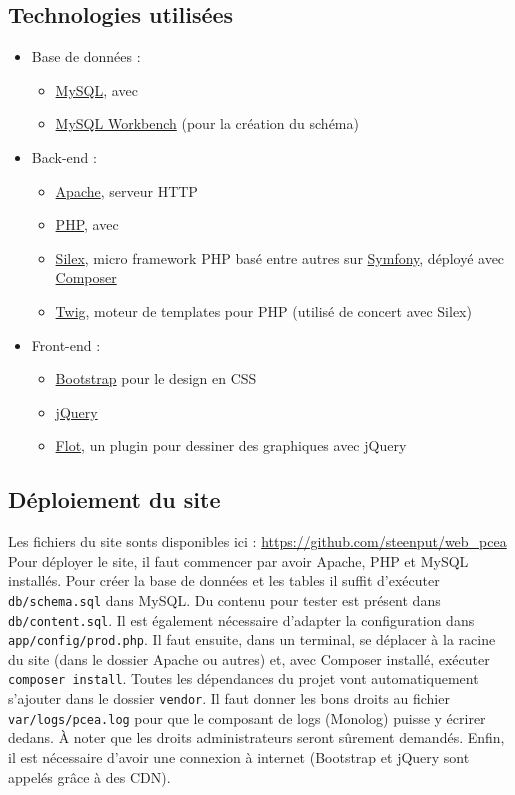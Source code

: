 \documentclass[a4paper, 12pt]{article}
\begin{document}
\subsection{Technologies utilisées}
\begin{itemize}
	\item Base de données :
	\begin{itemize}
		\item \href{https://www.mysql.com/}{MySQL}, avec
		\item \href{https://www.mysql.com/products/workbench/}{MySQL Workbench} (pour la création du schéma)
	\end{itemize}
	\item Back-end :
	\begin{itemize}
		\item \href{https://httpd.apache.org/}{Apache}, serveur HTTP
		\item \href{http://php.net/}{PHP}, avec
		\item \href{https://silex.symfony.com/}{Silex}, micro framework PHP basé entre autres sur \href{https://symfony.com/}{Symfony}, déployé avec \href{https://getcomposer.org/}{Composer}
		\item \href{https://twig.symfony.com/}{Twig}, moteur de templates pour PHP (utilisé de concert avec Silex)
	\end{itemize}
	\item Front-end :
	\begin{itemize}
		\item \href{http://getbootstrap.com/}{Bootstrap} pour le design en CSS
		\item \href{https://jquery.org/}{jQuery}
		\item \href{http://www.flotcharts.org/}{Flot}, un plugin pour dessiner des graphiques avec jQuery
	\end{itemize}
\end{itemize}

\subsection{Déploiement du site}
Les fichiers du site sonts disponibles ici : \url{https://github.com/steenput/web_pcea}
Pour déployer le site, il faut commencer par avoir Apache, PHP et MySQL installés. Pour créer la base de données 
et les tables il suffit d'exécuter \texttt{db/schema.sql} dans MySQL. Du contenu pour tester est 
présent dans \texttt{db/content.sql}. Il est également nécessaire d'adapter la configuration dans 
\texttt{app/config/prod.php}. Il faut ensuite, dans un terminal, se déplacer à la racine du site 
(dans le dossier Apache ou autres) et, avec Composer installé, exécuter \texttt{composer install}. 
Toutes les dépendances du projet vont automatiquement s'ajouter dans le dossier \texttt{vendor}.
Il faut donner les bons droits au fichier \texttt{var/logs/pcea.log} pour que le composant de 
logs (Monolog) puisse y écrirer dedans. À noter que les droits administrateurs seront sûrement demandés. 
Enfin, il est nécessaire d'avoir une connexion à internet (Bootstrap et jQuery sont appelés grâce à des CDN).
\end{document}
